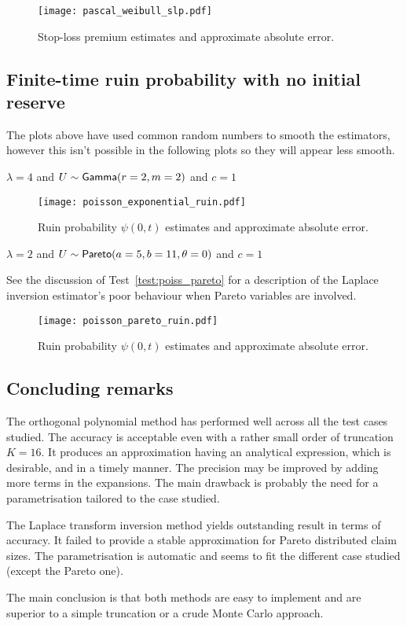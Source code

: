 \begin{figure}[H]
\centering
\texttt{[image: pascal\_weibull\_slp.pdf]}
\caption{Stop-loss premium estimates and approximate absolute error.}
\end{figure}


\subsection{Finite-time ruin probability with no initial reserve} \label{subsec:ApproximationFiniteTimeRuinProbability}

The plots above have used common random numbers to smooth the estimators, however this isn't possible in the following plots so they will appear less smooth.

\begin{test}
$\lambda=4$ and $U\sim\mathsf{Gamma}(r=2,m=2)$ and $c=1$
\end{test}


\begin{figure}[H]
\centering
\texttt{[image: poisson\_exponential\_ruin.pdf]}
\caption{Ruin probability $\psi(0, t)$ estimates and approximate absolute error.}
\end{figure}


\begin{test} $\lambda=2$ and $U \sim \mathsf{Pareto}(a=5,b=11,\theta=0)$ and $c=1$
\end{test}

See the discussion of Test~\ref{test:poiss_pareto} for a description of the Laplace inversion estimator's poor behaviour when Pareto variables are involved.

\begin{figure}[H]
\centering
\texttt{[image: poisson\_pareto\_ruin.pdf]}
\caption{Ruin probability $\psi(0, t)$ estimates and approximate absolute error.}
\end{figure}
\subsection{Concluding remarks}
The orthogonal polynomial method has performed well across all the test cases studied. The accuracy is acceptable even with a rather small order of truncation $K=16$. It produces an approximation having an analytical expression, which is desirable, and in a timely manner. The precision may be improved by adding more terms in the expansions. The main drawback is probably the need for a parametrisation tailored to the case studied.

The Laplace transform inversion method yields outstanding result in terms of accuracy. It failed to provide a stable approximation for Pareto distributed claim sizes. The parametrisation is automatic and seems to fit the different case studied (except the Pareto one).

The main conclusion is that both methods are easy to implement and are superior to a simple truncation or a crude Monte Carlo approach.